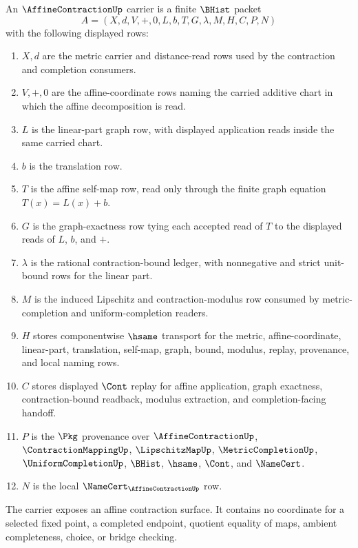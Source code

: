 \begin{definition}
\label{def:affine-contraction-carrier}
An $\AffineContractionUp$ carrier is a finite $\BHist$ packet
$$
A=(X,d,V,+,0,L,b,T,G,\lambda,M,H,C,P,N)
$$
with the following displayed rows:
\begin{enumerate}
\item $X,d$ are the metric carrier and distance-read rows used by the contraction and completion consumers.
\item $V,+,0$ are the affine-coordinate rows naming the carried additive chart in which the affine decomposition is read.
\item $L$ is the linear-part graph row, with displayed application reads inside the same carried chart.
\item $b$ is the translation row.
\item $T$ is the affine self-map row, read only through the finite graph equation $T(x)=L(x)+b$.
\item $G$ is the graph-exactness row tying each accepted read of $T$ to the displayed reads of $L$, $b$, and $+$.
\item $\lambda$ is the rational contraction-bound ledger, with nonnegative and strict unit-bound rows for the linear part.
\item $M$ is the induced Lipschitz and contraction-modulus row consumed by metric-completion and uniform-completion readers.
\item $H$ stores componentwise $\hsame$ transport for the metric, affine-coordinate, linear-part, translation, self-map, graph, bound, modulus, replay, provenance, and local naming rows.
\item $C$ stores displayed $\Cont$ replay for affine application, graph exactness, contraction-bound readback, modulus extraction, and completion-facing handoff.
\item $P$ is the $\Pkg$ provenance over $\AffineContractionUp$, $\ContractionMappingUp$, $\LipschitzMapUp$, $\MetricCompletionUp$, $\UniformCompletionUp$, $\BHist$, $\hsame$, $\Cont$, and $\NameCert$.
\item $N$ is the local $\NameCert_{\AffineContractionUp}$ row.
\end{enumerate}
The carrier exposes an affine contraction surface. It contains no coordinate for a selected fixed point, a completed endpoint, quotient equality of maps, ambient completeness, choice, or bridge checking.
\end{definition}


